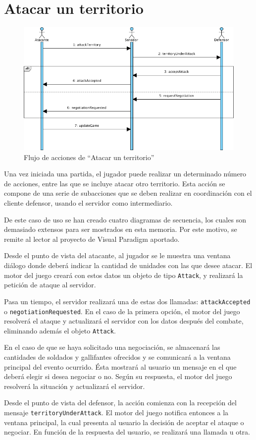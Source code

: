 \section{Atacar un territorio}

\begin{figure}[ht]
\centering
\includegraphics[scale=0.6]{img/ch03devel-attack.png}
\caption{Flujo de acciones de ``Atacar un territorio''}
\end{figure}

Una vez iniciada una partida, el jugador puede realizar un determinado número de
acciones, entre las que se incluye atacar otro territorio. Esta acción se
compone de una serie de subacciones que se deben realizar en coordinación con
el cliente defensor, usando el servidor como intermediario.

De este caso de uso se han creado cuatro diagramas de secuencia, los cuales son
demasiado extensos para ser mostrados en esta memoria. Por este motivo, se
remite al lector al proyecto de Visual Paradigm aportado.

Desde el punto de vista del atacante, al jugador se le muestra una ventana
diálogo donde deberá indicar la cantidad de unidades con las que desee atacar.
El motor del juego creará con estos datos un objeto de tipo \texttt{Attack}, y
realizará la petición de ataque al servidor.

Pasa un tiempo, el servidor realizará una de estas dos llamadas:
\texttt{attackAccepted} o \texttt{negotiationRequested}. En el caso de la
primera opción, el motor del juego resolverá el ataque y actualizará el
servidor con los datos después del combate, eliminando además el objeto
\texttt{Attack}.

En el caso de que se haya solicitado una negociación, se almacenará las
cantidades de soldados y gallifantes ofrecidos y se comunicará a la ventana
principal del evento ocurrido. Ésta mostrará al usuario un mensaje en el que
deberá elegir si desea negociar o no. Según su respuesta, el motor del juego
resolverá la situación y actualizará el servidor.

Desde el punto de vista del defensor, la acción comienza con la recepción del
mensaje \texttt{territoryUnderAttack}. El motor del juego notifica entonces a
la ventana principal, la cual presenta al usuario la decisión de aceptar el
ataque o negociar. En función de la respuesta del usuario, se realizará una
llamada u otra.